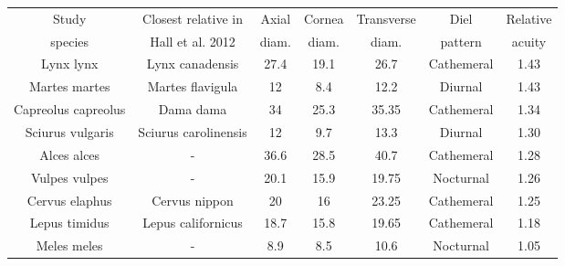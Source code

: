 \begin{tabular}{ccccccc}
	\toprule
	Study & Closest relative in & Axial & Cornea & Transverse & Diel  &Relative \\
	species& Hall et al. 2012 & diam. & diam. & diam. & pattern & acuity \\
	\midrule
	Lynx lynx & Lynx canadensis 	& 27.4 & 19.1 & 26.7 		& Cathemeral &1.43 \\	%
	Martes martes & Martes flavigula & 12 & 8.4 & 12.2 			& Diurnal 	&1.43 \\	%
	Capreolus capreolus & Dama dama & 34 & 25.3 & 35.35 		& Cathemeral &1.34 \\	%
	Sciurus vulgaris & Sciurus carolinensis & 12 & 9.7 & 13.3 	& Diurnal 	&1.30 \\	%
	Alces alces & -  				& 36.6 & 28.5 & 40.7 		& Cathemeral &1.28 \\	%
	Vulpes vulpes & -				 & 20.1 & 15.9 & 19.75	 	& Nocturnal &1.26 \\	%
	Cervus elaphus & Cervus nippon 		& 20 & 16 & 23.25 		& Cathemeral &1.25 \\	%
	Lepus timidus & Lepus californicus & 18.7 & 15.8 & 19.65 	& Cathemeral &1.18 \\ 	%
	Meles meles & - 				 & 8.9 & 8.5 & 10.6 		& Nocturnal &1.05 \\	%
	\bottomrule
\end{tabular}
